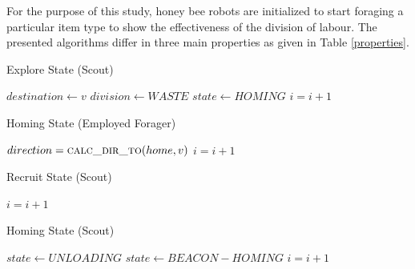 For the purpose of this study, honey bee robots are initialized to start foraging a particular item type to show the effectiveness of the division of labour. The presented algorithms differ in three main properties as given in Table \ref{properties}.

\begin{algorithm}
\caption{Explore State (Scout)}
\label{algorithm:explore}
\begin{algorithmic}[1]
\State {}
\State {}
 	\State {}
	\State $destination \gets v$
	\State {}
	\State $division \gets WASTE$
	\State $state \gets HOMING$
\EndIf
\State $i =i + 1$
\EndFunction
\end{algorithmic}
\end{algorithm}

\begin{algorithm}
\caption{Homing State (Employed Forager)}
\label{algorithm:employedforager:homing}
\begin{algorithmic}[1]
\State $direction = \Call{calc\_dir\_to}{home,v}$
\State {}
\EndIf
\State $i =i + 1$
\EndFunction
\end{algorithmic}
\end{algorithm}

\begin{algorithm}
\caption{Recruit State (Scout)}
\label{algorithm:recruit}
\begin{algorithmic}[1]
	\State {} 
\Else 
	\Else
	\EndIf
\EndIf
\State $i =i + 1$
\EndFunction
\end{algorithmic}
\end{algorithm}

\begin{algorithm}
\caption{Homing State (Scout)}
\label{algorithm:scout:homing}
\begin{algorithmic}[1]
	
\EndIf
{}
	\State {}
		\State $state \gets UNLOADING$
	\Else
		\State $state \gets BEACON-HOMING$	
	\EndIf
\EndIf
\State $i =i + 1$
\EndFunction
\end{algorithmic}
\end{algorithm}

